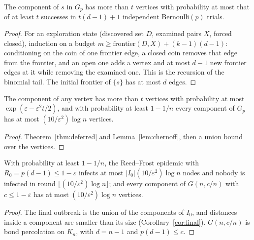 \begin{theorem}\label{thm:deferred}
\leanok{}
The component of $s$ in $G_p$ has more than $t$ vertices with probability at most that of at
least $t$ successes in $t(d-1)+1$ independent Bernoulli$(p)$ trials.
\end{theorem}
\begin{proof}\leanok
For an exploration state (discovered set $D$, examined pairs $X$, forced closed), induction on a
budget $m \ge \mathrm{frontier}(D, X) + (k-1)(d-1)$: conditioning on the coin of one frontier edge,
a closed coin removes that edge from the frontier, and an open one adds a vertex and at most $d-1$
new frontier edges at it while removing the examined one. This is the recursion of the binomial
tail. The initial frontier of $\{s\}$ has at most $d$ edges.
\end{proof}

\begin{theorem}\label{thm:subcritical}
\leanok{}
The component of any vertex has more than $t$ vertices with probability at most
$\exp(\varepsilon - \varepsilon^2 t/2)$, and with probability at least $1 - 1/n$ every component of
$G_p$ has at most $(10/\varepsilon^2)\log n$ vertices.
\end{theorem}
\begin{proof}\leanok
Theorem~\ref{thm:deferred} and Lemma~\ref{lem:chernoff}, then a union bound over the vertices.
\end{proof}

\begin{corollary}\label{cor:subcritical}
\leanok{}
With probability at least $1 - 1/n$, the Reed--Frost epidemic with $R_0 = p(d-1) \le 1 -
\varepsilon$ infects at most $|I_0| (10/\varepsilon^2)\log n$ nodes and nobody is infected in round
$\lfloor (10/\varepsilon^2)\log n \rfloor$; and every component of $G(n, c/n)$ with
$c \le 1 - \varepsilon$ has at most $(10/\varepsilon^2)\log n$ vertices.
\end{corollary}
\begin{proof}\leanok
The final outbreak is the union of the components of $I_0$, and distances inside a component are
smaller than its size (Corollary~\ref{cor:final}). $G(n, c/n)$ is bond percolation on $K_n$, with
$d = n - 1$ and $p(d-1) \le c$.
\end{proof}

